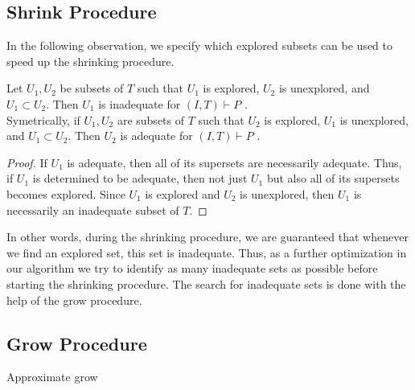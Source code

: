 \subsection{Shrink Procedure}
\label{sec:shrink}

\iffalse
We can effectively use the set  \textit{Explored} for speeding up the shrinking procedure. When testing the set $U \setminus \{T_i\}$ (see line 2 in Algorithm~\ref{shrink-procedure}) we first check whether  $U \setminus \{T_i\}$ is explored. If so, the status of  $U \setminus \{T_i\}$ is known and no test for adequacy is needed.
\fi

In the following observation, we specify which explored subsets can be used to speed up the shrinking procedure.


\begin{observation}
\label{observation:explored-property}
Let $U_1, U_2$ be subsets of $T$ such that $U_1$ is explored, $U_2$ is unexplored, and $U_1 \subset U_2$. Then $U_1$ is inadequate  for $(I, T) \vdash P$ .\\
Symetrically, if $U_1, U_2$ are subsets of $T$ such that $U_2$ is explored, $U_1$ is unexplored, and $U_1 \subset U_2$. Then $U_2$ is adequate  for $(I, T) \vdash P$ .
\end{observation}

\begin{proof}
If $U_1$ is adequate, then all of its supersets are necessarily adequate. Thus, if $U_1$ is determined to be adequate, then not just $U_1$ but also all of its supersets becomes explored. Since $U_1$ is explored and $U_2$ is unexplored, then $U_1$ is necessarily an inadequate subset of $T$.
\end{proof}

In other words, during the shrinking procedure, we are guaranteed that whenever we find an explored set, this set is inadequate.
Thus, as a further optimization in our algorithm we try to identify as many inadequate sets as possible before starting the shrinking procedure.
The search for inadequate sets is done with the help  of the grow procedure.






\subsection{Grow Procedure}\label{sec:grow}
\begin{algorithm}[!t]
\begin{small}

\caption{Approximate grow}
\label{approx-grow}
\end{small}
\end{algorithm}

